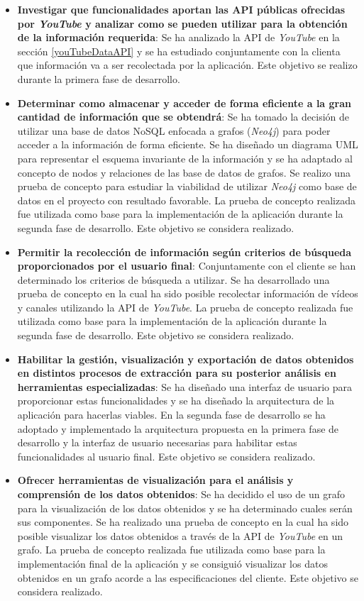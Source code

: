 \documentclass[11pt,a4paper]{article}
\begin{document}
\begin{itemize}
\item \textbf{Investigar que funcionalidades aportan las API públicas ofrecidas por \textit{YouTube} y analizar como se pueden utilizar para la obtención de la información requerida}: Se ha analizado la API de \textit{YouTube} en la sección \ref{youTubeDataAPI} y se ha estudiado conjuntamente con la clienta que información va a ser recolectada por la aplicación. Este objetivo se realizo durante la primera fase de desarrollo.
\item \textbf{Determinar como almacenar y acceder de forma eficiente a la gran cantidad de información que se obtendrá}: Se ha tomado la decisión de utilizar una base de datos NoSQL enfocada a grafos (\textit{Neo4j}) para poder acceder a la información de forma eficiente. Se ha diseñado un diagrama UML para representar el esquema invariante de la información y se ha adaptado al concepto de nodos y relaciones de las base de datos de grafos. Se realizo una prueba de concepto para estudiar la viabilidad de utilizar \textit{Neo4j} como base de datos en el proyecto con resultado favorable. La prueba de concepto realizada fue utilizada como base para la implementación de la aplicación durante la segunda fase de desarrollo. Este objetivo se considera realizado.
\newpage 
\item \textbf{Permitir la recolección de información según criterios de búsqueda proporcionados por el usuario final}: Conjuntamente con el cliente se han determinado los criterios de búsqueda a utilizar. Se ha desarrollado una prueba de concepto en la cual ha sido posible recolectar información de vídeos y canales utilizando la API de \textit{YouTube}. La prueba de concepto realizada fue utilizada como base para la implementación de la aplicación durante la segunda fase de desarrollo. Este objetivo se considera realizado.
\item \textbf{Habilitar la gestión, visualización y exportación de datos obtenidos en distintos procesos de extracción para su posterior análisis en herramientas especializadas}: Se ha diseñado una interfaz de usuario para proporcionar estas funcionalidades y se ha diseñado la arquitectura de la aplicación para hacerlas viables. En la segunda fase de desarrollo se ha adoptado y implementado la arquitectura propuesta en la primera fase de desarrollo y la interfaz de usuario necesarias para habilitar estas funcionalidades al usuario final. Este objetivo se considera realizado.
\item \textbf{Ofrecer herramientas de visualización para el análisis y comprensión de los datos obtenidos}: Se ha decidido el uso de un grafo para la visualización de los datos obtenidos y se ha determinado cuales serán sus componentes. Se ha realizado una prueba de concepto en la cual ha sido posible visualizar los datos obtenidos a través de la API de \textit{YouTube} en un grafo. La prueba de concepto realizada fue utilizada como base para la implementación final de la aplicación y se consiguió visualizar los datos obtenidos en un grafo acorde a las especificaciones del cliente. Este objetivo se considera realizado.

\end{itemize}
\end{document}
